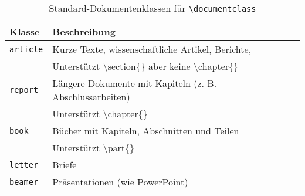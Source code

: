 \begin{table}[H]
    \centering
    \begin{tabular}{ll}
        \toprule
        \textbf{Klasse}  & \textbf{Beschreibung}                                                         \\
        \midrule
        \texttt{article} & Kurze Texte, wissenschaftliche Artikel, Berichte,                             \\
                         & Unterstützt \textbackslash section\{\}  aber keine \textbackslash chapter\{\} \\
        \texttt{report}  & Längere Dokumente mit Kapiteln (z. B. Abschlussarbeiten)                      \\
                         & Unterstützt \textbackslash chapter\{\}                                        \\
        \texttt{book}    & Bücher mit Kapiteln, Abschnitten und Teilen                                   \\
                         & Unterstützt \textbackslash part\{\}                                           \\
        \texttt{letter}  & Briefe                                                                        \\

        \texttt{beamer}  & Präsentationen (wie PowerPoint)                                               \\
        \bottomrule
    \end{tabular}
    \caption{Standard-Dokumentenklassen für \texttt{\textbackslash documentclass}}
    \label{tab:dokumentklassen}
\end{table}